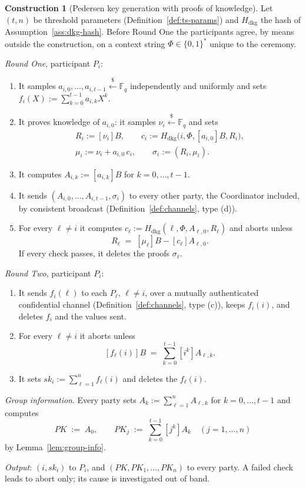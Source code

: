 \documentclass[11pt,a4paper]{article}
\theoremstyle{definition}
\newtheorem{construction}[theorem]{Construction}
\newcommand{\F}{\mathbb{F}}
\newcommand{\Fq}{\F_q}
\begin{document}
\begin{construction}[Pedersen key generation with proofs of knowledge]
\label{def:dkg}
Let \((t, n)\) be threshold parameters (Definition~\ref{def:ts-params}) and
\(H_{\mathrm{dkg}}\) the hash of Assumption~\ref{ass:dkg-hash}. Before Round
One the participants agree, by means outside the construction, on a context
string \(\Phi \in \{0,1\}^{*}\) unique to the ceremony.

\emph{Round One}, participant \(P_i\):
\begin{enumerate}
\item It samples \(a_{i,0}, \dots, a_{i,t-1} \xleftarrow{\$} \Fq\)
  independently and uniformly and sets
  \(f_i(X) := \sum_{k=0}^{t-1} a_{i,k} X^k\).
\item It proves knowledge of \(a_{i,0}\): it samples
  \(\nu_i \xleftarrow{\$} \Fq\) and sets
  \begin{gather*}
    R_i := [\nu_i]B , \qquad
    c_i := H_{\mathrm{dkg}}\bigl(i, \Phi, [a_{i,0}]B, R_i\bigr) , \\
    \mu_i := \nu_i + a_{i,0}\, c_i , \qquad
    \sigma_i := (R_i, \mu_i) .
  \end{gather*}
\item It computes \(A_{i,k} := [a_{i,k}]B\) for \(k = 0, \dots, t - 1\).
\item It sends \((A_{i,0}, \dots, A_{i,t-1}, \sigma_i)\) to every other
  party, the Coordinator included, by consistent broadcast
  (Definition~\ref{def:channels}, type (d)).
\item For every \(\ell \ne i\) it computes
  \(c_\ell := H_{\mathrm{dkg}}(\ell, \Phi, A_{\ell,0}, R_\ell)\) and aborts
  unless
  \[
    R_\ell \;=\; [\mu_\ell]B - [c_\ell] A_{\ell,0} .
  \]
  If every check passes, it deletes the proofs \(\sigma_\ell\).
\end{enumerate}

\emph{Round Two}, participant \(P_i\):
\begin{enumerate}
\item It sends \(f_i(\ell)\) to each \(P_\ell\), \(\ell \ne i\), over a
  mutually authenticated confidential channel
  (Definition~\ref{def:channels}, type (c)), keeps \(f_i(i)\), and deletes
  \(f_i\) and the values sent.
\item For every \(\ell \ne i\) it aborts unless
  \[
    [f_\ell(i)]B \;=\; \sum_{k=0}^{t-1} [i^k] A_{\ell,k} .
  \]
\item It sets \(\mathit{sk}_i := \sum_{\ell=1}^{n} f_\ell(i)\) and deletes
  the \(f_\ell(i)\).
\end{enumerate}

\emph{Group information}. Every party sets
\(A_k := \sum_{\ell=1}^{n} A_{\ell,k}\) for \(k = 0, \dots, t - 1\) and
computes
\[
  \mathit{PK} \;:=\; A_0 , \qquad
  \mathit{PK}_j \;:=\; \sum_{k=0}^{t-1} [j^k] A_k
  \quad (j = 1, \dots, n)
\]
by Lemma~\ref{lem:group-info}.

\emph{Output}: \((i, \mathit{sk}_i)\) to \(P_i\), and
\((\mathit{PK}, \mathit{PK}_1, \dots, \mathit{PK}_n)\) to every party. A
failed check leads to abort only; its cause is investigated out of band.
\end{construction}
\end{document}
